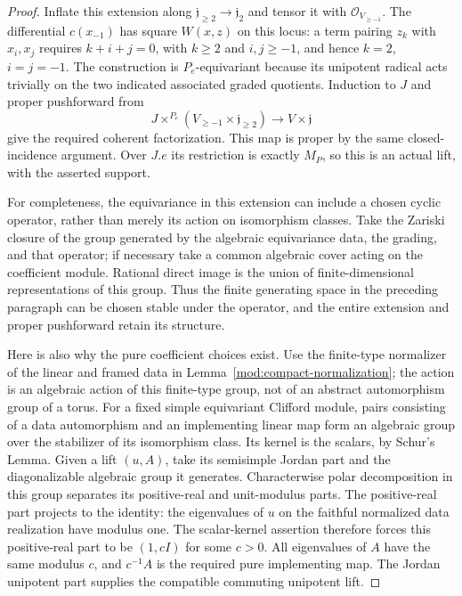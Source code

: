 \begin{proof}
Inflate this extension along
$\mathfrak j_{\ge2}\to\mathfrak j_2$ and tensor it with
$\mathcal O_{V_{\ge-1}}$.  The differential $c(x_{-1})$ has square
$W(x,z)$ on this locus: a term pairing $z_k$ with $x_i,x_j$ requires
$k+i+j=0$, with $k\ge2$ and $i,j\ge-1$, and hence
$k=2$, $i=j=-1$.  The construction is $P_e$-equivariant because its
unipotent radical acts trivially on the two indicated associated
graded quotients.  Induction to $J$ and proper pushforward from
\[
 J\times^{P_e}(V_{\ge-1}\times\mathfrak j_{\ge2})
                 \longrightarrow V\times\mathfrak j
\]
give the required coherent factorization.  This map is proper by the
same closed-incidence argument.  Over $J.e$ its restriction is exactly
$M_P$, so this is an actual lift, with the asserted support.

For completeness, the equivariance in this extension can include a
chosen cyclic operator, rather than merely its action on isomorphism
classes.  Take the Zariski closure of the group generated by the
algebraic equivariance data, the grading, and that operator; if
necessary take a common algebraic cover acting on the coefficient
module.  Rational direct image is the union of finite-dimensional
representations of this group.  Thus the finite generating space in
the preceding paragraph can be chosen stable under the operator, and
the entire extension and proper pushforward retain its structure.

Here is also why the pure coefficient choices exist.  Use the
finite-type normalizer of the linear and framed data in
Lemma~\ref{mod:compact-normalization}; the action is an algebraic action
of this finite-type group, not of an abstract automorphism group of a
torus.  For a fixed simple equivariant Clifford module, pairs
consisting of a data automorphism and an implementing linear map form
an algebraic group over the stabilizer of its isomorphism class.  Its
kernel is the scalars, by Schur's Lemma.  Given a lift $(u,A)$, take its
semisimple Jordan part and the diagonalizable algebraic group it
generates.  Characterwise polar decomposition in this group separates
its positive-real and unit-modulus parts.  The positive-real part
projects to the identity: the eigenvalues of $u$ on the faithful
normalized data realization have modulus one.  The scalar-kernel
assertion therefore forces this positive-real part to be $(1,cI)$
for some $c>0$.  All eigenvalues of $A$ have the same modulus $c$,
and $c^{-1}A$ is the required pure implementing map.  The Jordan
unipotent part supplies the compatible commuting unipotent lift.


\end{proof}
